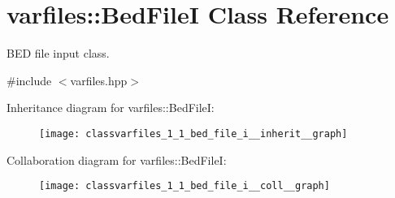 \hypertarget{classvarfiles_1_1_bed_file_i}{}\section{varfiles\+:\+:Bed\+FileI Class Reference}
\label{classvarfiles_1_1_bed_file_i}


B\+ED file input class.  




{\ttfamily \#include $<$varfiles.\+hpp$>$}



Inheritance diagram for varfiles\+:\+:Bed\+FileI\+:\nopagebreak
\begin{figure}[H]
\begin{center}
\leavevmode
\texttt{[image: classvarfiles\_1\_1\_bed\_file\_i\_\_inherit\_\_graph]}
\end{center}
\end{figure}


Collaboration diagram for varfiles\+:\+:Bed\+FileI\+:\nopagebreak
\begin{figure}[H]
\begin{center}
\leavevmode
\texttt{[image: classvarfiles\_1\_1\_bed\_file\_i\_\_coll\_\_graph]}
\end{center}
\end{figure}
